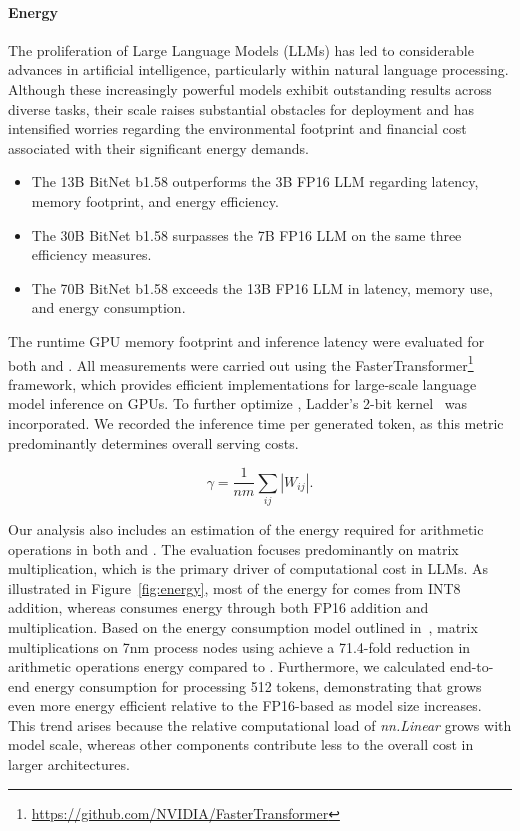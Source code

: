 \paragraph{Energy}

The proliferation of Large Language Models (LLMs) has led to considerable advances in artificial intelligence, particularly within natural language processing. Although these increasingly powerful models exhibit outstanding results across diverse tasks, their scale raises substantial obstacles for deployment and has intensified worries regarding the environmental footprint and financial cost associated with their significant energy demands.

\begin{itemize}
    \item The 13B BitNet b1.58 outperforms the 3B FP16 LLM regarding latency, memory footprint, and energy efficiency.
    \item The 30B BitNet b1.58 surpasses the 7B FP16 LLM on the same three efficiency measures.
    \item The 70B BitNet b1.58 exceeds the 13B FP16 LLM in latency, memory use, and energy consumption.
\end{itemize}

The runtime GPU memory footprint and inference latency were evaluated for both  and . All measurements were carried out using the FasterTransformer\footnote{\url{https://github.com/NVIDIA/FasterTransformer}} framework, which provides efficient implementations for large-scale language model inference on GPUs. To further optimize , Ladder’s 2-bit kernel~\cite{ladder} was incorporated. We recorded the inference time per generated token, as this metric predominantly determines overall serving costs.

\begin{equation}
    \gamma = \frac{1}{nm}\sum_{ij} |W_{ij}|.
\end{equation}

Our analysis also includes an estimation of the energy required for arithmetic operations in both  and . The evaluation focuses predominantly on matrix multiplication, which is the primary driver of computational cost in LLMs. As illustrated in Figure~\ref{fig:energy}, most of the energy for  comes from INT8 addition, whereas  consumes energy through both FP16 addition and multiplication. Based on the energy consumption model outlined in~\cite{energycost, pokebnn}, matrix multiplications on 7nm process nodes using  achieve a 71.4-fold reduction in arithmetic operations energy compared to . Furthermore, we calculated end-to-end energy consumption for processing 512 tokens, demonstrating that  grows even more energy efficient relative to the FP16-based  as model size increases. This trend arises because the relative computational load of \emph{nn.Linear} grows with model scale, whereas other components contribute less to the overall cost in larger architectures.


